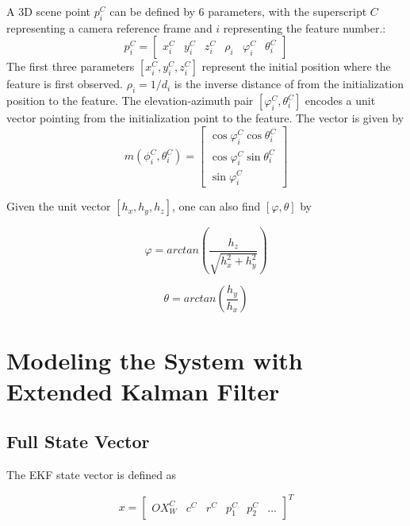 A 3D scene point $p_{i}^{C}$ can be defined by 6 parameters, with the 
superscript $C$ representing a camera reference frame and $i$
representing the feature number.:
\begin{equation}
p_{i}^{C}=\begin{bmatrix}
x_{i}^{C} & y_{i}^{C} & z_{i}^{C} & \rho _{i} & \varphi _{i}^{C} & 
\theta _{i}^{C} 
\end{bmatrix}
\end{equation}
The first three parameters $[x_{i}^{C}, y_{i}^{C}, z_{i}^{C}]$
represent the initial position where the feature is first observed.
$\rho_{i} = 1/d_i$ is the inverse distance of from the initialization position
to the feature. The elevation-azimuth pair $[\varphi_{i}^{C},
\theta_{i}^{C}]$ encodes a unit vector pointing from the
initialization point to the feature. The vector is given by
\begin{equation}
\label{eq:m}
m(\phi_{i}^{C}, \theta_{i}^{C})=\begin{bmatrix}
\cos\varphi_{i}^{C}\cos\theta _{i}^{C} \\
\cos\varphi_{i}^{C}\sin\theta _{i}^{C} \\
\sin\varphi_{i}^{C}
\end{bmatrix}
\end{equation}

Given the unit vector $[h_x, h_y, h_z]$, one can also find $[\varphi, \theta]$ by

\begin{equation}
\label{eq:m_inv_varphi}
\varphi 
=arctan\left(\frac{h_{z}}{\sqrt{h_x^2+h_y^2}}\right)
\end{equation}

\begin{equation}
\label{eq:m_inv_theta}
\theta =arctan\left(\frac{h_{y}}{h_{x}}\right)
\end{equation}


\section{Modeling the System with Extended Kalman 
Filter}

\subsection{Full State Vector}

The EKF state vector is defined as 

\begin{equation}
x=\begin{bmatrix}
OX_{W}^{C} & c^{C} & r^{C} & p_{1}^{C} & p_{2}^{C} & \ldots 
\end{bmatrix}^T
\end{equation}

